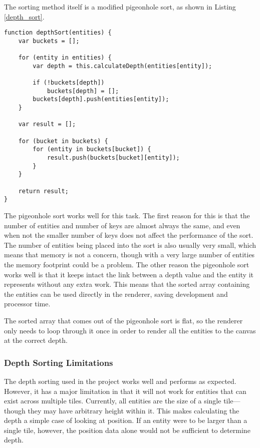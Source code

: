 The sorting method itself is a modified pigeonhole sort, as shown in Listing \ref{depth_sort}.

\noindent
\begin{minipage}{\linewidth}
\begin{lstlisting}[style=js, caption={Depth sorting entities in a scene using a modified pigeonhole sort.}, label=depth_sort]
function depthSort(entities) {
    var buckets = [];

    for (entity in entities) {
        var depth = this.calculateDepth(entities[entity]);

        if (!buckets[depth])
            buckets[depth] = [];
        buckets[depth].push(entities[entity]);
    }

    var result = [];

    for (bucket in buckets) {
        for (entity in buckets[bucket]) {
            result.push(buckets[bucket][entity]);
        }
    }

    return result;
}
\end{lstlisting}
\end{minipage}

The pigeonhole sort works well for this task. The first reason for this is that the number of entities and number of keys are almost always the same, and even when not the smaller number of keys does not affect the performance of the sort. The number of entities being placed into the sort is also usually very small, which means that memory is not a concern, though with a very large number of entities the memory footprint could be a problem. The other reason the pigeonhole sort works well is that it keeps intact the link between a depth value and the entity it represents without any extra work. This means that the sorted array containing the entities can be used directly in the renderer, saving development and processor time.

The sorted array that comes out of the pigeonhole sort is flat, so the renderer only needs to loop through it once in order to render all the entities to the canvas at the correct depth.

\subsubsection{Depth Sorting Limitations}\label{depth_limits}
The depth sorting used in the project works well and performs as expected. However, it has a major limitation in that it will not work for entities that can exist across multiple tiles. Currently, all entities are the size of a single tile---though they may have arbitrary height within it. This makes calculating the depth a simple case of looking at position. If an entity were to be larger than a single tile, however, the position data alone would not be sufficient to determine depth.


